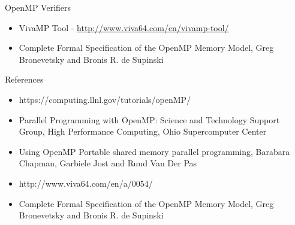 \documentclass[10pt]{beamer}
\begin{document}
\begin{frame}{OpenMP Verifiers}
\begin{itemize}
\item VivaMP Tool -  \url{http://www.viva64.com/en/vivamp-tool/}
\item Complete Formal Specification of the OpenMP Memory Model,
  Greg Bronevetsky and Bronis R. de Supinski
\end{itemize}
\end{frame}





\begin{frame}{References}
\begin{itemize}
\item https://computing.llnl.gov/tutorials/openMP/
\item Parallel Programming with OpenMP: Science and Technology Support Group, High Performance Computing, Ohio Supercomputer Center
\item Using OpenMP Portable shared memory parallel programming, Barabara Chapman, Garbiele Jost and Ruud Van Der Pas
\item http://www.viva64.com/en/a/0054/
\item Complete Formal Specification of the OpenMP Memory Model,
  Greg Bronevetsky and Bronis R. de Supinski
\end{itemize}
\end{frame}
\end{document}

